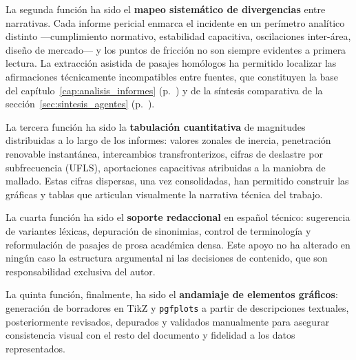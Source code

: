La segunda función ha sido el \textbf{mapeo sistemático de divergencias} entre
narrativas. Cada informe pericial enmarca el incidente en un perímetro
analítico distinto ---cumplimiento normativo, estabilidad capacitiva,
oscilaciones inter-área, diseño de mercado--- y los puntos de fricción no son
siempre evidentes a primera lectura. La extracción asistida de pasajes
homólogos ha permitido localizar las afirmaciones técnicamente incompatibles
entre fuentes, que constituyen la base del capítulo~\ref{cap:analisis_informes}
(p.~\pageref{cap:analisis_informes}) y de la síntesis comparativa de la
sección~\ref{sec:sintesis_agentes} (p.~\pageref{sec:sintesis_agentes}).

La tercera función ha sido la \textbf{tabulación cuantitativa} de magnitudes
distribuidas a lo largo de los informes: valores zonales de inercia,
penetración renovable instantánea, intercambios transfronterizos, cifras de
deslastre por subfrecuencia (UFLS), aportaciones capacitivas atribuidas a la
maniobra de mallado. Estas cifras dispersas, una vez consolidadas, han
permitido construir las gráficas y tablas que articulan visualmente la
narrativa técnica del trabajo.

La cuarta función ha sido el \textbf{soporte redaccional} en español técnico:
sugerencia de variantes léxicas, depuración de sinonimias, control de
terminología y reformulación de pasajes de prosa académica densa. Este apoyo
no ha alterado en ningún caso la estructura argumental ni las decisiones de
contenido, que son responsabilidad exclusiva del autor.

La quinta función, finalmente, ha sido el \textbf{andamiaje de elementos
gráficos}: generación de borradores en TikZ y \texttt{pgfplots} a partir de
descripciones textuales, posteriormente revisados, depurados y validados
manualmente para asegurar consistencia visual con el resto del documento y
fidelidad a los datos representados.

